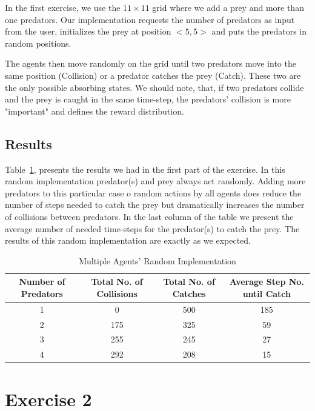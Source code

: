 \documentclass[a4paper,11pt]{article}
\begin{document}
In the first exercise, we use the $11 \times 11$ grid where we add a prey and more than one predators. Our implementation requests the number of predators as input from the user, initializes the prey at position $<5,5>$ and puts the predators in random positions. 

The agents then move randomly on the grid until two predators move into the same position (Collision) or a predator catches the prey (Catch). These two are the only possible absorbing states. We should note, that, if two predators collide and the prey is caught in the same time-step, the predators' collision is more "important" and defines the reward distribution.


\subsection{Results}
Table~\ref{table:multirandom}, presents the results we had in the first part of the exercise. In this random implementation predator(s) and prey always act randomly. Adding more predators to this particular case o random actions by all agents does reduce the number of steps needed to catch the prey but dramatically increases the number of collisions between predators. In the last column of the table we present the average number of needed time-steps for the predator(s) to catch the prey. The results of this random implementation are exactly as we expected.
\begin{table}[h]
\begin{center}
\caption{Multiple Agents' Random Implementation}
\begin{tabular}{c c c c} 
\hline\hline               
\textbf{\small{Number of Predators}} & \textbf{\small{Total No. of Collisions}} & \textbf{\small{Total No. of Catches}} & \textbf{\small{Average Step No. until Catch}} \\  
\hline
1 & 0 & 500 & 185\\ 
2 & 175 & 325  & 59\\
3 & 255 & 245   & 27\\
4 & 292 & 208 & 15 \\ 
\end{tabular}
\label{table:multirandom} 
\end{center} 
\end{table} 

\section{Exercise 2}
\end{document}
